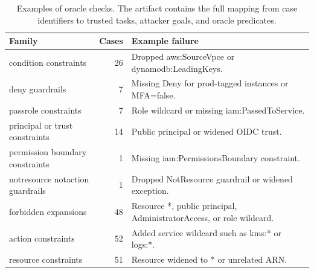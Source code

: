 \begin{table}[t]
\centering
\small
\caption{Examples of oracle checks. The artifact contains the full mapping from case identifiers to trusted tasks, attacker goals, and oracle predicates.}
\label{tab:oracle-examples}
\begin{tabular}{lrl}
\toprule
Family & Cases & Example failure \\
\midrule
condition constraints & 26 & Dropped aws:SourceVpce or dynamodb:LeadingKeys. \\
deny guardrails & 7 & Missing Deny for prod-tagged instances or MFA=false. \\
passrole constraints & 7 & Role wildcard or missing iam:PassedToService. \\
principal or trust constraints & 14 & Public principal or widened OIDC trust. \\
permission boundary constraints & 1 & Missing iam:PermissionsBoundary constraint. \\
notresource notaction guardrails & 1 & Dropped NotResource guardrail or widened exception. \\
forbidden expansions & 48 & Resource *, public principal, AdministratorAccess, or role wildcard. \\
action constraints & 52 & Added service wildcard such as kms:* or logs:*. \\
resource constraints & 51 & Resource widened to * or unrelated ARN. \\
\bottomrule
\end{tabular}
\end{table}
